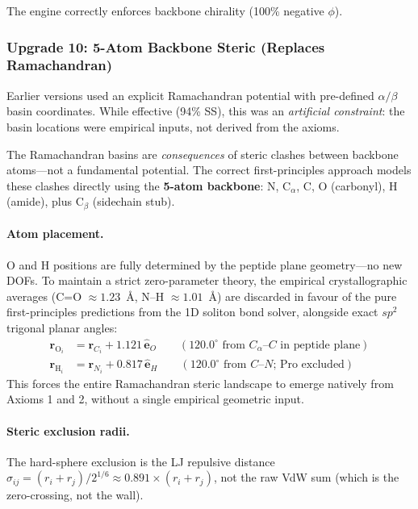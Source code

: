The engine correctly enforces backbone chirality (100\% negative $\phi$).

\subsubsection{Upgrade 10: 5-Atom Backbone Steric (Replaces Ramachandran)}
\label{sec:5atom_steric}

Earlier versions used an explicit Ramachandran potential with pre-defined $\alpha/\beta$ basin coordinates.  While effective (94\% SS), this was an \emph{artificial constraint}: the basin locations were empirical inputs, not derived from the axioms.

The Ramachandran basins are \emph{consequences} of steric clashes between backbone atoms---not a fundamental potential.  The correct first-principles approach models these clashes directly using the \textbf{5-atom backbone}: N, C$_\alpha$, C, O (carbonyl), H (amide), plus C$_\beta$ (sidechain stub).

\paragraph{Atom placement.}
O and H positions are fully determined by the peptide plane geometry---no new DOFs. To maintain a strict zero-parameter theory, the empirical crystallographic averages (C=O $\approx 1.23$~\AA, N--H $\approx 1.01$~\AA) are discarded in favour of the pure first-principles predictions from the 1D soliton bond solver, alongside exact $sp^2$ trigonal planar angles:
\begin{align}
    \mathbf{r}_{\text{O}_i} &= \mathbf{r}_{C_i} + 1.121\,\hat{\mathbf{e}}_O \qquad (120.0^\circ \text{ from } C_\alpha\text{--}C \text{ in peptide plane}) \\
    \mathbf{r}_{\text{H}_i} &= \mathbf{r}_{N_i} + 0.817\,\hat{\mathbf{e}}_H \qquad (120.0^\circ \text{ from } C\text{--}N \text{; Pro excluded})
\end{align}
This forces the entire Ramachandran steric landscape to emerge natively from Axioms 1 and 2, without a single empirical geometric input.

\paragraph{Steric exclusion radii.}
The hard-sphere exclusion is the LJ repulsive distance $\sigma_{ij} = (r_i + r_j) / 2^{1/6} \approx 0.891 \times (r_i + r_j)$, not the raw VdW sum (which is the zero-crossing, not the wall).

